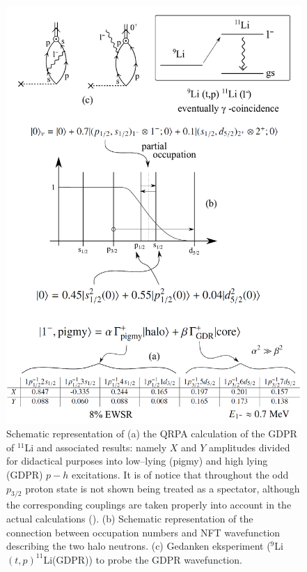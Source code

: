 \begin{subappendices}
\begin{figure}
\centerline{\includegraphics*[width=14cm,angle=0]{nutshell/figs/fig3C1}}
\caption{Schematic representation of (a) the QRPA calculation of the GDPR of $^{11}$Li and associated results: namely $X$ and $Y$ amplitudes divided for didactical purposes into low--lying (pigmy) and high lying (GDPR) $p-h$ excitations. It is of notice that throughout the odd $p_{3/2}$ proton state is not shown being treated as a spectator, although the corresponding couplings are taken properly into account in the actual calculations (\cite{Barranco:01}). (b) Schematic representation of the connection between occupation numbers and NFT wavefunction describing the two halo neutrons. (c) Gedanken eksperiment ($^9$Li$(t,p)^{11}$Li(GDPR)) to probe the GDPR wavefunction. }\label{fig3C1}
\end{figure}


\end{subappendices}
